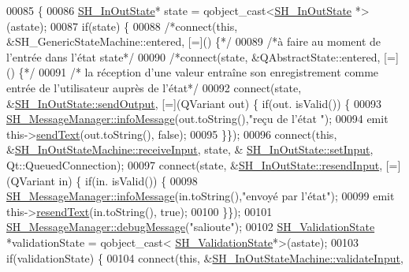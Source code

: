 \begin{DoxyCode}
00085 \{
00086     \hyperlink{classSH__InOutState}{SH\_InOutState}* state = qobject\_cast<\hyperlink{classSH__InOutState}{SH\_InOutState} *>(astate);
00087     \textcolor{keywordflow}{if}(state) \{
00088         \textcolor{comment}{/*connect(this, &SH\_GenericStateMachine::entered, [=]() \{*/}
00089         \textcolor{comment}{/*à faire au moment de l'entrée dans l'état state*/}
00090         \textcolor{comment}{/*connect(state, &QAbstractState::entered, [=]() \{*/}
00091         \textcolor{comment}{/* la réception d'une valeur entraîne son enregistrement comme entrée de l'utilisateur auprès de
       l'état*/}
00092         connect(state, &\hyperlink{classSH__InOutState_a77921c5f42059bc97361f4ff7827da12}{SH\_InOutState::sendOutput}, [=](QVariant out) \{ \textcolor{keywordflow}{if}(out.
      isValid()) \{
00093                 \hyperlink{classSH__MessageManager_a0b35c2f96e6d69934bf7f7c1e2172ea9}{SH\_MessageManager::infoMessage}(out.toString(),\textcolor{stringliteral}{"reçu de l'état
      "});
00094                 emit this->\hyperlink{classSH__InOutStateMachine_a5e7f5958bae31696b6a8deab94ad2b4f}{sendText}(out.toString(), \textcolor{keyword}{false});
00095             \}\});
00096         connect(\textcolor{keyword}{this}, &\hyperlink{classSH__InOutStateMachine_a037ed5e13ecfae2123a8d4940292e410}{SH\_InOutStateMachine::receiveInput}, state, &
      \hyperlink{classSH__InOutState_aaec9c2b5ef7c406bff7469461352d47c}{SH\_InOutState::setInput}, Qt::QueuedConnection);
00097         connect(state, &\hyperlink{classSH__InOutState_a1f00480afefd173002cf56d4c4128048}{SH\_InOutState::resendInput}, [=](QVariant in) \{  \textcolor{keywordflow}{if}(in.
      isValid()) \{
00098                 \hyperlink{classSH__MessageManager_a0b35c2f96e6d69934bf7f7c1e2172ea9}{SH\_MessageManager::infoMessage}(in.toString(),\textcolor{stringliteral}{"envoyé par
       l'état"});
00099                 emit this->\hyperlink{classSH__InOutStateMachine_a526822c66b46aa0cd81ba4473fa5573f}{resendText}(in.toString(), \textcolor{keyword}{true});
00100             \}\});
00101         \hyperlink{classSH__MessageManager_a379f2aa0a590a5add34dbe91f98b2ff7}{SH\_MessageManager::debugMessage}(\textcolor{stringliteral}{"salioute"});
00102         \hyperlink{classSH__ValidationState}{SH\_ValidationState} *validationState = qobject\_cast<
      \hyperlink{classSH__ValidationState}{SH\_ValidationState}*>(astate);
00103         \textcolor{keywordflow}{if}(validationState) \{
00104             connect(\textcolor{keyword}{this}, &\hyperlink{classSH__InOutStateMachine_aec1b3fef3c1f82499aa1f73beaecd08a}{SH\_InOutStateMachine::validateInput}, 

\end{DoxyCode}
